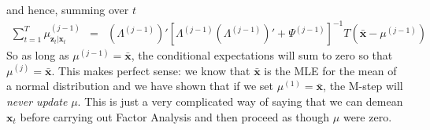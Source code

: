 and hence, summing over $t$
	\begin{eqnarray*}
		\sum_{t = 1}^T \mu^{(j-1)}_{\mathbf{z}_t|\mathbf{x}_t} &=& \left(\Lambda^{(j-1)}\right)' \left[\Lambda^{(j-1)} \left(\Lambda^{(j-1)}\right)' + \Psi^{(j-1)}\right]^{-1} T\left(\bar{\mathbf{x}} - \mu^{(j-1)} \right)
 	\end{eqnarray*}
So as long as $\mu^{(j-1)} = \bar{\mathbf{x}}$, the conditional expectations will sum to zero so that $\mu^{(j)} = \bar{\mathbf{x}}$. This makes perfect sense: we know that $\bar{\mathbf{x}}$ is the MLE for the mean of a normal distribution and we have shown that if we set $\mu^{(1)} = \bar{\mathbf{x}}$, the M-step will \emph{never update} $\mu$. This is just a very complicated way of saying that we can demean $\mathbf{x}_t$ before carrying out Factor Analysis and then proceed as though $\mu$ were zero. 

